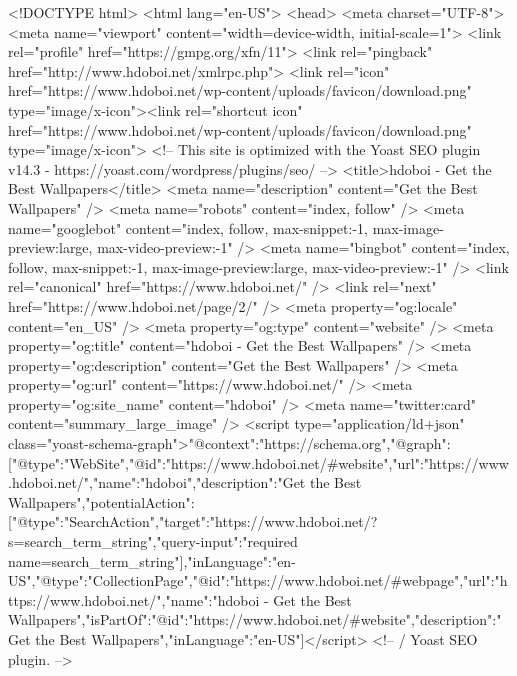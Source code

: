 <!DOCTYPE html>
<html lang="en-US">
<head>
<meta charset="UTF-8">
<meta name="viewport" content="width=device-width, initial-scale=1">
<link rel="profile" href="https://gmpg.org/xfn/11">
<link rel="pingback" href="http://www.hdoboi.net/xmlrpc.php">
<link rel="icon" href="https://www.hdoboi.net/wp-content/uploads/favicon/download.png" type="image/x-icon"><link rel="shortcut icon" href="https://www.hdoboi.net/wp-content/uploads/favicon/download.png" type="image/x-icon">
	<!-- This site is optimized with the Yoast SEO plugin v14.3 - https://yoast.com/wordpress/plugins/seo/ -->
	<title>hdoboi - Get the Best Wallpapers</title>
	<meta name="description" content="Get the Best Wallpapers" />
	<meta name="robots" content="index, follow" />
	<meta name="googlebot" content="index, follow, max-snippet:-1, max-image-preview:large, max-video-preview:-1" />
	<meta name="bingbot" content="index, follow, max-snippet:-1, max-image-preview:large, max-video-preview:-1" />
	<link rel="canonical" href="https://www.hdoboi.net/" />
	<link rel="next" href="https://www.hdoboi.net/page/2/" />
	<meta property="og:locale" content="en_US" />
	<meta property="og:type" content="website" />
	<meta property="og:title" content="hdoboi - Get the Best Wallpapers" />
	<meta property="og:description" content="Get the Best Wallpapers" />
	<meta property="og:url" content="https://www.hdoboi.net/" />
	<meta property="og:site_name" content="hdoboi" />
	<meta name="twitter:card" content="summary_large_image" />
	<script type="application/ld+json" class="yoast-schema-graph">{"@context":"https://schema.org","@graph":[{"@type":"WebSite","@id":"https://www.hdoboi.net/#website","url":"https://www.hdoboi.net/","name":"hdoboi","description":"Get the Best Wallpapers","potentialAction":[{"@type":"SearchAction","target":"https://www.hdoboi.net/?s={search_term_string}","query-input":"required name=search_term_string"}],"inLanguage":"en-US"},{"@type":"CollectionPage","@id":"https://www.hdoboi.net/#webpage","url":"https://www.hdoboi.net/","name":"hdoboi - Get the Best Wallpapers","isPartOf":{"@id":"https://www.hdoboi.net/#website"},"description":"Get the Best Wallpapers","inLanguage":"en-US"}]}</script>
	<!-- / Yoast SEO plugin. -->


